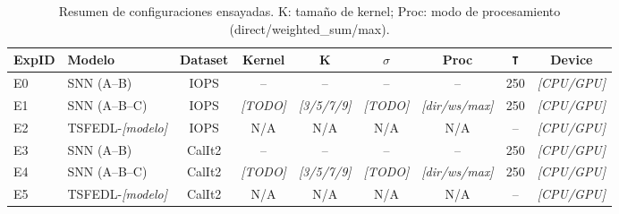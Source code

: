 \begin{table}[htbp]
\centering
\small
\begin{tabular}{llccccccc}
\hline\hline
\textbf{ExpID} & \textbf{Modelo} & \textbf{Dataset} & \textbf{Kernel} & \textbf{K} & \(\sigma\) & \textbf{Proc} & \texttt{T} & \textbf{Device} \\
\hline
E0 & SNN (A--B) & IOPS & -- & -- & -- & -- & 250 & \textit{[CPU/GPU]} \\
E1 & SNN (A--B--C) & IOPS & \textit{[TODO]} & \textit{[3/5/7/9]} & \textit{[TODO]} & \textit{[dir/ws/max]} & 250 & \textit{[CPU/GPU]} \\
E2 & TSFEDL-\textit{[modelo]} & IOPS & N/A & N/A & N/A & N/A & -- & \textit{[CPU/GPU]} \\
E3 & SNN (A--B) & CalIt2 & -- & -- & -- & -- & 250 & \textit{[CPU/GPU]} \\
E4 & SNN (A--B--C) & CalIt2 & \textit{[TODO]} & \textit{[3/5/7/9]} & \textit{[TODO]} & \textit{[dir/ws/max]} & 250 & \textit{[CPU/GPU]} \\
E5 & TSFEDL-\textit{[modelo]} & CalIt2 & N/A & N/A & N/A & N/A & -- & \textit{[CPU/GPU]} \\
\hline\hline
\end{tabular}
\caption{Resumen de configuraciones ensayadas. K: tamaño de kernel; Proc: modo de procesamiento (direct/weighted\_sum/max).}
\label{tab:resumen-configuraciones}
\end{table}
